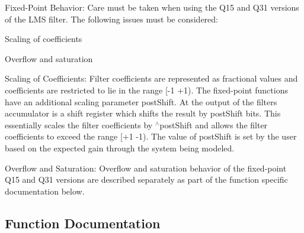 \begin{DoxyParagraph}{Fixed-\/\+Point Behavior\+:}
Care must be taken when using the Q15 and Q31 versions of the L\+MS filter. The following issues must be considered\+:
\begin{DoxyItemize}
\item Scaling of coefficients
\item Overflow and saturation
\end{DoxyItemize}
\end{DoxyParagraph}
\begin{DoxyParagraph}{Scaling of Coefficients\+:}
Filter coefficients are represented as fractional values and coefficients are restricted to lie in the range {\ttfamily \mbox{[}-\/1 +1)}. The fixed-\/point functions have an additional scaling parameter {\ttfamily post\+Shift}. At the output of the filter\textquotesingle{}s accumulator is a shift register which shifts the result by {\ttfamily post\+Shift} bits. This essentially scales the filter coefficients by {$^\wedge$post\+Shift} and allows the filter coefficients to exceed the range {\ttfamily \mbox{[}+1 -\/1)}. The value of {\ttfamily post\+Shift} is set by the user based on the expected gain through the system being modeled.
\end{DoxyParagraph}
\begin{DoxyParagraph}{Overflow and Saturation\+:}
Overflow and saturation behavior of the fixed-\/point Q15 and Q31 versions are described separately as part of the function specific documentation below. 
\end{DoxyParagraph}


\subsection{Function Documentation}
